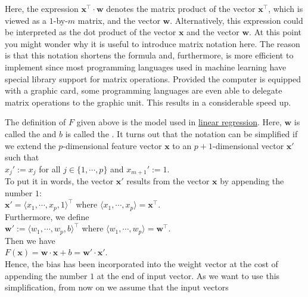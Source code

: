 Here, the expression $\mathbf{x}^\top \cdot \mathbf{w}$ denotes the matrix product of the vector
$\mathbf{x}^\top$, which is viewed as a $1$-by-$m$ matrix, and the vector $\mathbf{w}$.  Alternatively, this
expression could be interpreted as the dot product of the vector $\mathbf{x}$ and the vector $\mathbf{w}$.
At this point you might wonder why it is useful to introduce matrix notation here.  The reason is
that this notation shortens the formula and, furthermore, is more efficient to implement since most
programming languages used in machine learning have special library support for matrix operations.  
Provided the computer is equipped with a graphic card,  some
programming languages are even able to delegate matrix operations to the graphic unit.  This results in a
considerable speed up.

The definition of $F$ given above is the model used in
\href{https://en.wikipedia.org/wiki/Linear_regression}{linear regression}. 
Here, $\mathbf{w}$ is called the  and $b$ is called the .  It turns
out that the notation can be simplified if we extend the $p$-dimensional feature vector $\mathbf{x}$ to an
$p+1$-dimensional vector $\mathbf{x}'$ such that
\\[0.2cm]
\hspace*{1.3cm}
$x_j' := x_j$ \quad for all $j\in\{1,\cdots,p\}$ \quad and \quad $x_{m+1}' := 1$.
\\[0.2cm]
To put it in words, the vector $\mathbf{x}'$ results from the vector $\mathbf{x}$ by appending the number $1$:
\\[0.2cm]
\hspace*{1.3cm}
$\mathbf{x}' = \langle x_1, \cdots, x_p, 1 \rangle^\top$ \quad where $\langle x_1, \cdots, x_p \rangle = \mathbf{x}^\top$.
\\[0.2cm]
Furthermore, we define 
\\[0.2cm]
\hspace*{1.3cm}
$\mathbf{w}' := \langle w_1, \cdots, w_p, b \rangle^\top$ \quad where $\langle w_1, \cdots, w_p \rangle = \mathbf{w}^\top$.
\\[0.2cm]
Then we have
\\[0.2cm]
\hspace*{1.3cm}
$F(\mathbf{x}) = \mathbf{w} \cdot \mathbf{x} + b = \mathbf{w}' \cdot \mathbf{x}'$.
\\[0.2cm]
Hence, the bias has been incorporated into the weight vector at the cost of appending the number $1$ at the end of
input vector.  As we want to use this simplification, from now on we assume that the input vectors
